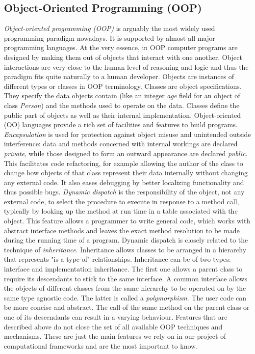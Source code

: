 \subsection{Object-Oriented Programming (OOP)}
\label{background_oop}
\quad \textit{Object-oriented programming (OOP)} is arguably the most widely used programming paradigm nowadays. It is supported by almost all major programming languages. At the very essence, in OOP computer programs are designed by making them out of objects that interact with one another. Object interactions are very close to the human level of reasoning and logic and thus the paradigm fits quite naturally to a human developer.\newline\null
\quad Objects are instances of different types or classes in OOP terminology. Classes are object specifications. They specify the data objects contain (like an integer \textit{age} field for an object of class \textit{Person}) and the methods used to operate on the data. Classes define the public part of objects as well as their internal implementation. Object-oriented (OO) languages provide a rich set of facilities and features to build programs.\newline\null
\quad \textit{Encapsulation} is used for protection against object misuse and unintended outside interference: data and methods concerned with internal workings are declared \textit{private}, while those designed to form an outward appearance are declared \textit{public}. This facilitates code refactoring, for example allowing the author of the class to change how objects of that class represent their data internally without changing any external code. It also eases debugging by better localizing functionality and thus possible bugs.\newline\null
\quad \textit{Dynamic dispatch} is the responsibility of the object, not any external code, to select the procedure to execute in response to a method call, typically by looking up the method at run time in a table associated with the object. This feature allows a programmer to write general code, which works with abstract interface methods and leaves the exact method resolution to be made during the running time of a program.\newline\null
\quad Dynamic dispatch is closely related to the technique of \textit{inheritance}. Inheritance allows classes to be arranged in a hierarchy that represents "is-a-type-of" relationships. Inheritance can be of two types: interface and implementation inheritance. The first one allows a parent class to require its descendants to stick to the same interface. A common interface allows the objects of different classes from the same hierarchy to be operated on by the same type agnostic code. The latter is called a \textit{polymorphism}. The user code can be more concise and abstract. The call of the same method on the parent class or one of its descendants can result in a varying behaviour.\newline\null
\quad Features that are described above do not close the set of all available OOP techniques and mechanisms. These are just the main features we rely on in our project of computational frameworks and are the most important to know.
